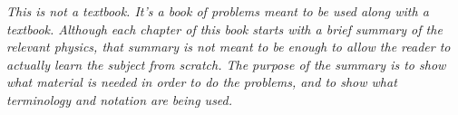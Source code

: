 \noindent\emph{This is not a textbook. It's a book of problems meant to be used
along with a textbook. Although each chapter of this book starts with a brief summary
of the relevant physics, that summary is not meant to be enough to allow the reader
to actually learn the subject from scratch. The purpose of the summary is to show what material
is needed in order to do the problems, and to show what terminology and notation
are being used.}

